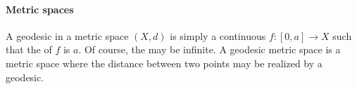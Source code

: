 \documentclass[12pt]{article}
\begin{document}
\paragraph{Metric spaces}
A geodesic in a metric space $(X,d)$ is simply a continuous $f:[0,a]\to X$ such that the 
 of $f$ is $a$. 
Of course, the  may be infinite. A geodesic metric space  is a metric space 
where the distance between two points may be realized by a geodesic.

\end{document}
